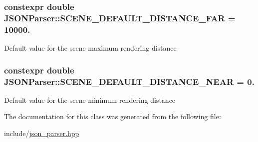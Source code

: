 \subsubsection[{\texorpdfstring{S\+C\+E\+N\+E\+\_\+\+D\+E\+F\+A\+U\+L\+T\+\_\+\+D\+I\+S\+T\+A\+N\+C\+E\+\_\+\+F\+AR}{SCENE_DEFAULT_DISTANCE_FAR}}]{\setlength{\rightskip}{0pt plus 5cm}constexpr double J\+S\+O\+N\+Parser\+::\+S\+C\+E\+N\+E\+\_\+\+D\+E\+F\+A\+U\+L\+T\+\_\+\+D\+I\+S\+T\+A\+N\+C\+E\+\_\+\+F\+AR = 10000.\hspace{0.3cm}{\ttfamily [static]}}\hypertarget{class_j_s_o_n_parser_adcd06251c7b4b7ae8386d62dd4e72e07}{}\label{class_j_s_o_n_parser_adcd06251c7b4b7ae8386d62dd4e72e07}
Default value for the scene maximum rendering distance 
\subsubsection[{\texorpdfstring{S\+C\+E\+N\+E\+\_\+\+D\+E\+F\+A\+U\+L\+T\+\_\+\+D\+I\+S\+T\+A\+N\+C\+E\+\_\+\+N\+E\+AR}{SCENE_DEFAULT_DISTANCE_NEAR}}]{\setlength{\rightskip}{0pt plus 5cm}constexpr double J\+S\+O\+N\+Parser\+::\+S\+C\+E\+N\+E\+\_\+\+D\+E\+F\+A\+U\+L\+T\+\_\+\+D\+I\+S\+T\+A\+N\+C\+E\+\_\+\+N\+E\+AR = 0.\hspace{0.3cm}{\ttfamily [static]}}\hypertarget{class_j_s_o_n_parser_a319445abcd1d1aebf5016488df6184ac}{}\label{class_j_s_o_n_parser_a319445abcd1d1aebf5016488df6184ac}
Default value for the scene minimum rendering distance 

The documentation for this class was generated from the following file\+:\begin{DoxyCompactItemize}
\item 
include/\hyperlink{json__parser_8hpp}{json\+\_\+parser.\+hpp}\end{DoxyCompactItemize}
